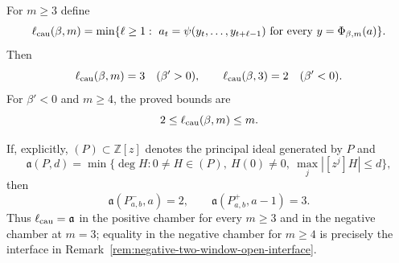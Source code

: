 \begin{theorem}
\label{thm:quadratic-optimal-causal-inverse}
For $m\ge3$ define
\[
\ell_{\rm cau}(\beta,m)
=\min\{\ell\ge1:\ a_t=\psi(y_t,\ldots,y_{t+\ell-1})
\text{ for every }y=\Phi_{\beta,m}(a)\}.
\]
Then
\[
\ell_{\rm cau}(\beta,m)=3\quad(\beta'>0),
\qquad
\ell_{\rm cau}(\beta,3)=2\quad(\beta'<0).
\]
For $\beta'<0$ and $m\ge4$, the proved bounds are
\[
2\le \ell_{\rm cau}(\beta,m)\le m.
\]

If, explicitly, $(P)\subset\mathbb Z[z]$ denotes the principal ideal
generated by $P$ and
\[
\mathfrak a(P,d)=\min\{\deg H:0\ne H\in(P),\ H(0)\ne0,
\ \max_j|[z^j]H|\le d\},
\]
then
\[
\mathfrak a(P^-_{a,b},a)=2,
\qquad
\mathfrak a(P^+_{a,b},a-1)=3.
\]
Thus $\ell_{\rm cau}=\mathfrak a$ in the positive chamber for every
$m\ge3$ and in the negative chamber at $m=3$; equality in the negative
chamber for $m\ge4$ is precisely the interface in
Remark~\ref{rem:negative-two-window-open-interface}.
\end{theorem}

